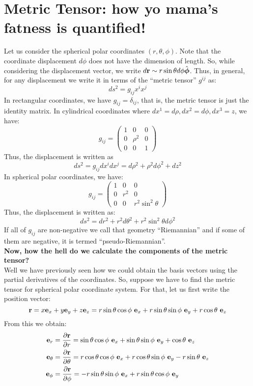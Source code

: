 \section{Metric Tensor: how yo mama's fatness is quantified!}
Let us consider the spherical polar coordinates $(r,\theta,\phi)$. Note that the coordinate displacement $d\phi$ does not have the dimension of length. So, while considering the displacement vector, we write $d\boldsymbol{\mathbf{r}} \sim r\sin\theta d\phi \hat{\boldsymbol{\mathbf{\phi}}}$. Thus, in general, for any displacement we write it in terms of the ``metric tensor'' $g^{ij}$ as:
$$ds^2 = g_{ij}x^ix^j$$
In rectangular coordinates, we have $g_{ij} = \delta_{ij}$, that is, the metric tensor is just the identity matrix. In cylindrical coordinates where $dx^1 = d\rho, dx^2 = d\phi, dx^3 = z$, we have:
$$g_{ij}= \begin{pmatrix}
    1 & 0 & 0\\
    0 & \rho^2 & 0\\
    0 & 0 & 1
\end{pmatrix}$$
Thus, the displacement is written as
$$ds^2 = g_{ij}dx^i dx^j = d\rho^2 + \rho^2 d\phi^2 + dz^2$$
In spherical polar coordinates, we have:
$$g_{ij} = \begin{pmatrix}
    1 & 0 & 0\\
    0 & r^2 & 0\\
    0 & 0 & r^2\sin^2\theta
\end{pmatrix}$$
Thus, the displacement is written as:
$$ds^2 = dr^2 + r^2 d\theta^2 + r^2\sin^2\theta d\phi^2$$
If all of $g_{ij}$ are non-negative we call that geometry ``Riemannian'' and if some of them are negative, it is termed ``pseudo-Riemannian''.\\[0.3cm]
\textbf{Now, how the hell do we calculate the components of the metric tensor?}\\[0.3cm]
Well we have previously seen how we could obtain the basis vectors using the partial derivatives of the coordinates. So, suppose we have to find the metric tensor for spherical polar coordinate system. For that, let us first write the position vector:
$$\veb{r} = x \veb{e}_x+y \veb{e}_y+z \veb{e}_z = r \sin\theta \cos\phi \ \veb{e}_x + r \sin\theta \sin\phi \ \veb{e}_y + r \cos\theta \ \veb{e}_z$$
From this we obtain:
\begin{align*}
    \veb{e}_r &= \pdv{\veb{r}}{r} =  \sin\theta \cos\phi \ \veb{e}_x + \sin\theta \sin\phi \ \veb{e}_y + \cos\theta \ \veb{e}_z\\
    \veb{e}_\theta &= \pdv{\veb{r}}{\theta} = r \cos\theta \cos\phi \ \veb{e}_x + r \cos\theta \sin\phi \ \veb{e}_y - r \sin\theta \ \veb{e}_z\\
    \veb{e}_\phi &= \pdv{\veb{r}}{\phi} = -r \sin\theta \sin\phi \ \veb{e}_x + r \sin\theta \cos\phi \ \veb{e}_y
\end{align*}
